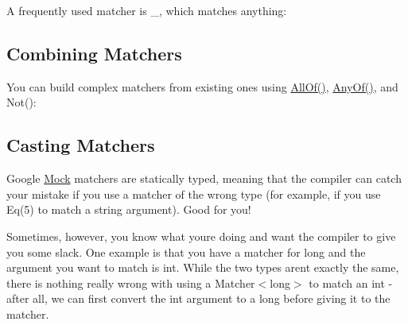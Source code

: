 A frequently used matcher is {\ttfamily \+\_\+}, which matches anything\+:


\begin{DoxyCode}{0}
\end{DoxyCode}


\subsection*{Combining Matchers}

You can build complex matchers from existing ones using {\ttfamily \mbox{\hyperlink{namespacetesting_af7618e8606c1cb45738163688944e2b7}{All\+Of()}}}, {\ttfamily \mbox{\hyperlink{namespacetesting_a81cfefd9f75cdce827d5bc873cf73aac}{Any\+Of()}}}, and {\ttfamily Not()}\+:


\begin{DoxyCode}{0}
\DoxyCodeLine{}
\end{DoxyCode}


\subsection*{Casting Matchers}

Google \mbox{\hyperlink{class_mock}{Mock}} matchers are statically typed, meaning that the compiler can catch your mistake if you use a matcher of the wrong type (for example, if you use {\ttfamily Eq(5)} to match a {\ttfamily string} argument). Good for you!

Sometimes, however, you know what you\textquotesingle{}re doing and want the compiler to give you some slack. One example is that you have a matcher for {\ttfamily long} and the argument you want to match is {\ttfamily int}. While the two types aren\textquotesingle{}t exactly the same, there is nothing really wrong with using a {\ttfamily Matcher$<$long$>$} to match an {\ttfamily int} -\/ after all, we can first convert the {\ttfamily int} argument to a {\ttfamily long} before giving it to the matcher.


